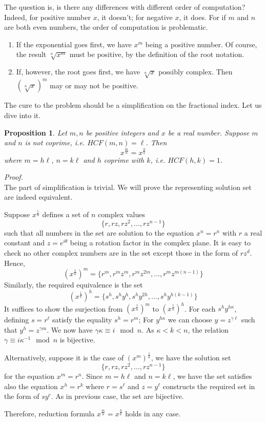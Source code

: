 \documentclass[12pt]{article}
\newtheorem*{proposition}{Proposition}
\renewenvironment{proof}[1][Proof]{\begin{snugshade*} \textit{{#1}.}\\}{\hfill \qedsymbol \end{snugshade*}}
\begin{document}
    The question is, is there any differences with different order of computation? Indeed, for positive number $x$, it doesn't; for negative $x$, it does. For if $m$ and $n$ are both even numbers, the order of computation is problematic.\begin{enumerate}
        \item If the exponential goes first, we have $x^m$ being a positive number. Of course, the result $\sqrt[n]{x^m}$ must be positive, by the definition of the root notation.
        \item If, however, the root goes first, we have $\sqrt[n]{x}$ possibly complex. Then $(\sqrt[n]{x})^m$ may or may not be positive.
    \end{enumerate}

    The cure to the problem should be a simplification on the fractional index. Let us dive into it.

    \begin{proposition}
        Let $m,n$ be positive integers and $x$ be a real number. Suppose $m$ and $n$ is not coprime, i.e. $HCF(m,n)=\ell$. Then $$x^{\frac{m}{n}}=x^{\frac{h}{k}}$$ where $m=h\ell$, $n=k\ell$ and $h$ coprime with $k$, i.e. $HCF(h,k)=1$.
    \end{proposition}

    \begin{proof}
        The part of simplification is trivial. We will prove the representing solution set are indeed equivalent.

        Suppose $x^{\frac{1}{n}}$ defines a set of $n$ complex values $$\{r,rz,rz^2,\dots,rz^{n-1}\}$$ such that all numbers in the set are solution to the equation $x^n=r^n$ with $r$ a real constant and $z=e^{i\theta}$ being a rotation factor in the complex plane. It is easy to check no other complex numbers are in the set except those in the form of $rz^d$. Hence, $$(x^{\frac{1}{n}})^m=\{r^m, r^m z^m, r^m z^{2m}, \dots, r^m z^{m(n-1)}\}$$
        Similarly, the required equivalence is the set $$(x^{\frac{1}{k}})^h=\{s^h, s^h y^h, s^h y^{2h}, \dots, s^h y^{h(k-1)}\}$$
        It suffices to show the surjection from $(x^{\frac{1}{n}})^m$ to $(x^{\frac{1}{k}})^h$. For each $s^h y^{h\kappa}$, defining $s=r^\ell$ satisfy the equality $s^h=r^m$; For $y^{h\kappa}$ we can choose $y=z^{\gamma\ell}$ such that $y^h=z^{\gamma m}$. We now have $\gamma\kappa \equiv i \mod n$. As $\kappa < k < n$, the relation $\gamma \equiv i \kappa^{-1} \mod n$ is bijective.

        Alternatively, suppose it is the case of $(x^m)^{\frac{1}{n}}$, we have the solution set $$\{r, rz, rz^2, \dots, rz^{n-1}\}$$ for the equation $x^m=r^n$. Since $m=h\ell$ and $n=k\ell$, we have the set satisfies also the equation $x^h=r^k$ where $r=s^\ell$ and $z=y^\ell$ constructs the required set in the form of $sy^c$. As in previous case, the set are bijective.
        
        Therefore, reduction formula $x^{\frac{m}{n}}=x^{\frac{h}{k}}$ holds in any case.
    \end{proof}
\end{document}
